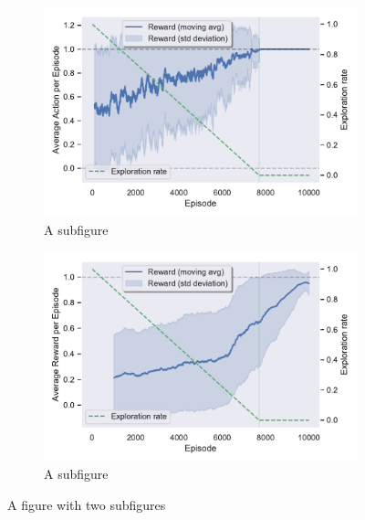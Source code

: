 \documentclass[11pt,a4paper,twoside]{report}
\newcommand{\+}{\textnormal{+} }
\theoremstyle{definition}
\numberwithin{equation}{chapter}
\begin{document}
\begin{figure}
  \centering
  \begin{subfigure}{.5\textwidth}
    \centering
    \includegraphics[width=1\linewidth]{figures/Avg-Action-Pendulum.pdf}
    \caption{A subfigure}
    \label{fig:sub1}
  \end{subfigure}%
  \begin{subfigure}{.5\textwidth}
    \centering
    \includegraphics[width=1\linewidth]{figures/Reward-Pendulum.pdf}
    \caption{A subfigure}
    \label{fig:sub2}
  \end{subfigure}
  \caption{A figure with two subfigures}
  \label{fig:test}
  \end{figure}







\clearpage
%
%
%
\end{document}
